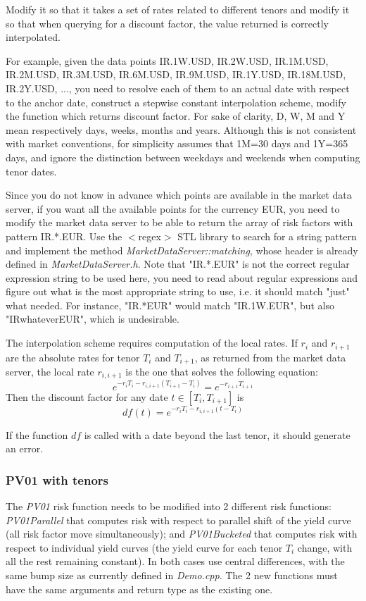 \documentclass[10pt]{article}
\begin{document}
Modify it so that it takes a set of rates related to different tenors and modify it so that when querying for a discount factor, the value returned is correctly interpolated.

For example, given the data points {IR.1W.USD, IR.2W.USD, IR.1M.USD, IR.2M.USD, IR.3M.USD, IR.6M.USD, IR.9M.USD, IR.1Y.USD, IR.18M.USD, IR.2Y.USD, ...}, you need to resolve each of them to an actual date with respect to the anchor date, construct a stepwise constant interpolation scheme, modify the function which returns discount factor. For sake of clarity, D, W, M and Y mean respectively days, weeks, months and years. Although this is not consistent with market conventions, for simplicity assumes that 1M=30 days and 1Y=365 days, and ignore the distinction between weekdays and weekends when computing tenor dates.

Since you do not know in advance which points are available in the market data server, if you want all the available points for the currency EUR, you need to modify the market data server to be able to return the array of risk factors with pattern IR.*.EUR. Use the $<$regex$>$ STL library to search for a string pattern and implement the method \textit{MarketDataServer::matching}, whose header is already defined in \textit{MarketDataServer.h}. Note that "IR.*.EUR" is not the correct regular expression string to be used here, you need to read about regular expressions and figure out what is the most appropriate string to use, i.e. it should match "just" what needed. For instance, "IR.*EUR" would match "IR.1W.EUR", but also "IRwhateverEUR", which is undesirable.

The interpolation scheme requires computation of the local rates. If $r_i$ and $r_{i+1}$ are the absolute rates for tenor $T_i$ and $T_{i+1}$, as returned from the market data server, the local rate $r_{i,i+1}$ is the one that solves the following equation:
$$e^{-r_iT_i-r_{i,i+1}(T_{i+1}-T_i)}=e^{-r_{i+1}T_{i+1}}$$
Then the discount factor for any date $t \in [T_i,T_{i+1}]$ is $$df(t)=e^{-r_i T_i-r_{i,i+1}(t-T_i)}$$

If the function $df$ is called with a date beyond the last tenor, it should generate an error.

\subsubsection{PV01 with tenors}
\label{sec:pv01}
The \textit{PV01} risk function needs to be modified into 2 different risk functions: \textit{PV01Parallel} that computes risk with respect to parallel shift of the yield curve (all risk factor move simultaneously); and \textit{PV01Bucketed} that computes risk with respect to individual yield curves (the yield curve for each tenor $T_i$ change, with all the rest remaining constant). In both cases use central differences, with the same bump size as currently defined in \textit{Demo.cpp}. The 2 new functions must have the same arguments and return type as the existing one. \\
\end{document}
